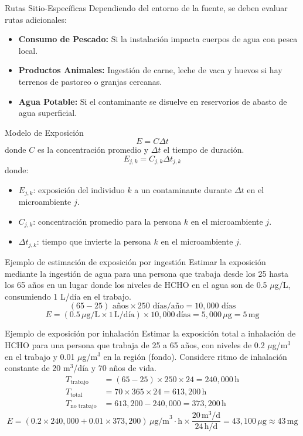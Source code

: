 \documentclass[10pt,compress]{beamer}
\begin{document}
\begin{frame}{Rutas Sitio-Específicas}
    Dependiendo del entorno de la fuente, se deben evaluar rutas adicionales:
    \begin{itemize}
        \item \textbf{Consumo de Pescado:} Si la instalación impacta cuerpos de agua con pesca local.
        \item \textbf{Productos Animales:} Ingestión de carne, leche de vaca y huevos si hay terrenos de pastoreo o granjas cercanas.
        \item \textbf{Agua Potable:} Si el contaminante se disuelve en reservorios de abasto de agua superficial.
    \end{itemize}
\end{frame}

\begin{frame}{Modelo de Exposición}
\[
E = C \Delta t
\]
donde \(C\) es la concentración promedio y \(\Delta t\) el tiempo de duración.
\[
E_{j,k} = C_{j,k} \Delta t_{j,k}
\]
donde:
\begin{itemize}
\item \(E_{j,k}\): exposición del individuo \(k\) a un contaminante durante \(\Delta t\) en el microambiente \(j\).
\item \(C_{j,k}\): concentración promedio para la persona \(k\) en el microambiente \(j\).
\item \(\Delta t_{j,k}\): tiempo que invierte la persona \(k\) en el microambiente \(j\).
\end{itemize}
\end{frame}

\begin{frame}{Ejemplo de estimación de exposición por ingestión}
Estimar la exposición mediante la ingestión de agua para una persona que trabaja desde los 25 hasta los 65 años en un lugar donde los niveles de HCHO en el agua son de 0.5 $\mu$g/L, consumiendo 1 L/día en el trabajo.
\[
(65-25) \text{ años} \times 250 \text{ días/año} = 10,000 \text{ días}
\]
\[
E = (0.5 \, \mu\text{g/L} \times 1 \, \text{L/día}) \times 10,000 \, \text{días} = 5,000 \, \mu\text{g} = 5 \, \text{mg}
\]
\end{frame}

\begin{frame}{Ejemplo de exposición por inhalación}
Estimar la exposición total a inhalación de HCHO para una persona que trabaja de 25 a 65 años, con niveles de 0.2 $\mu$g/m$^3$ en el trabajo y 0.01 $\mu$g/m$^3$ en la región (fondo). Considere ritmo de inhalación constante de 20 m$^3$/día y 70 años de vida.
\begin{align*}
T_{\text{trabajo}} &= (65-25) \times 250 \times 24 = 240,000 \, \text{h} \\
T_{\text{total}} &= 70 \times 365 \times 24 = 613,200 \, \text{h} \\
T_{\text{no trabajo}} &= 613,200 - 240,000 = 373,200 \, \text{h}
\end{align*}
\[
E = (0.2 \times 240,000 + 0.01 \times 373,200) \, \mu\text{g/m}^3 \cdot \text{h} \times \frac{20 \, \text{m}^3/\text{d}}{24 \, \text{h/d}} = 43,100 \, \mu\text{g} \approx 43 \, \text{mg}
\]
\end{frame}
\end{document}
